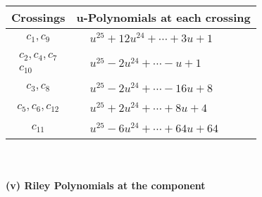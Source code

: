 \documentclass[1p]{elsarticle_modified}
\theoremstyle{definition}
\begin{document}
\begin{tabular}{m{50pt}|m{274pt}}
Crossings & \hspace{64pt}u-Polynomials at each crossing \\
\hline $$\begin{aligned}c_{1},c_{9}\end{aligned}$$&$\begin{aligned}
&u^{25}+12 u^{24}+\cdots+3 u+1
\end{aligned}$\\
\hline $$\begin{aligned}c_{2},c_{4},c_{7}\\c_{10}\end{aligned}$$&$\begin{aligned}
&u^{25}-2 u^{24}+\cdots- u+1
\end{aligned}$\\
\hline $$\begin{aligned}c_{3},c_{8}\end{aligned}$$&$\begin{aligned}
&u^{25}-2 u^{24}+\cdots-16 u+8
\end{aligned}$\\
\hline $$\begin{aligned}c_{5},c_{6},c_{12}\end{aligned}$$&$\begin{aligned}
&u^{25}+2 u^{24}+\cdots+8 u+4
\end{aligned}$\\
\hline $$\begin{aligned}c_{11}\end{aligned}$$&$\begin{aligned}
&u^{25}-6 u^{24}+\cdots+64 u+64
\end{aligned}$\\
\hline
\end{tabular}\\~\\
\newpage\renewcommand{\arraystretch}{1}
\flushleft \textbf{(v) Riley Polynomials at the component}\newline \\
\end{document}
